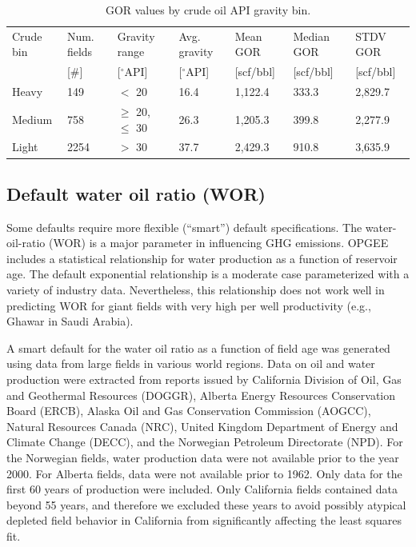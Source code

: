 \documentclass[11pt]{report}
\begin{document}
\begin{table}
\begin{scriptsize}
\caption{GOR values by crude oil API gravity bin.}
\label{tab:GOR_averages}
\begin{tabular*}{1\columnwidth}{p{}p{}p{}p{}p{}p{}p{}}
\toprule
Crude bin & Num. fields & Gravity range & Avg. gravity & Mean GOR & Median GOR & STDV GOR \\
& [\#] & [$^\circ$API] & [$^\circ$API] & [scf/bbl] & [scf/bbl] & [scf/bbl] \\
\midrule
Heavy & 149 & $<$ 20 & 16.4 & 1,122.4 & 333.3 & 2,829.7 \\
Medium & 758 & $\geq$ 20, $\leq$ 30 & 26.3 & 1,205.3 & 399.8 & 2,277.9 \\
Light & 2254 & $>$ 30 & 37.7 & 2,429.3 & 910.8 & 3,635.9 \\
\bottomrule
\end{tabular*}
\end{scriptsize}
\end{table}


\subsection{Default water oil ratio (WOR)} \label{WORSmartDefault}

Some defaults require more flexible ($“$smart$”$) default specifications. The water-oil-ratio (WOR) is a major parameter in influencing GHG emissions. OPGEE includes a statistical relationship for water production as a function of reservoir age. The default exponential relationship is a moderate case parameterized with a variety of industry data. Nevertheless, this relationship does not work well in predicting WOR for giant fields with very high per well productivity (e.g., Ghawar in Saudi Arabia).

A smart default for the water oil ratio as a function of field age was generated using data from large fields in various world regions. Data on oil and water production were extracted from reports issued by California Division of Oil, Gas and Geothermal Resources (DOGGR), Alberta Energy Resources Conservation Board (ERCB), Alaska Oil and Gas Conservation Commission (AOGCC), Natural Resources Canada (NRC), United Kingdom Department of Energy and Climate Change (DECC), and the Norwegian Petroleum Directorate (NPD). For the Norwegian fields, water production data were not available prior to the year 2000. For Alberta fields, data were not available prior to 1962. Only data for the first 60 years of production were included. Only California fields contained data beyond 55 years, and therefore we excluded these years to avoid possibly atypical depleted field behavior in California from significantly affecting the least squares fit. 
\end{document}
